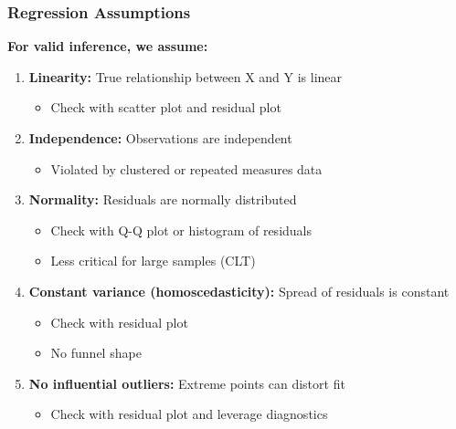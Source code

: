 \documentclass{beamer}
\begin{document}
\begin{frame}
\frametitle{Regression Assumptions}
\textbf{For valid inference, we assume:}

\begin{enumerate}
\item \textbf{Linearity:} True relationship between X and Y is linear
  \begin{itemize}
  \item Check with scatter plot and residual plot
  \end{itemize}

\item \textbf{Independence:} Observations are independent
  \begin{itemize}
  \item Violated by clustered or repeated measures data
  \end{itemize}

\item \textbf{Normality:} Residuals are normally distributed
  \begin{itemize}
  \item Check with Q-Q plot or histogram of residuals
  \item Less critical for large samples (CLT)
  \end{itemize}

\item \textbf{Constant variance (homoscedasticity):} Spread of residuals is constant
  \begin{itemize}
  \item Check with residual plot
  \item No funnel shape
  \end{itemize}

\item \textbf{No influential outliers:} Extreme points can distort fit
  \begin{itemize}
  \item Check with residual plot and leverage diagnostics
  \end{itemize}
\end{enumerate}
\end{frame}
\end{document}
